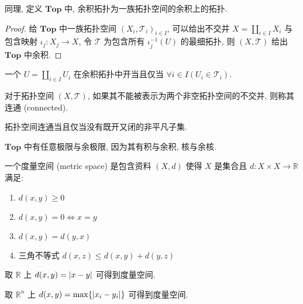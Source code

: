 \begin{definition}[余积拓扑]
    同理, 定义 \(\mathbf{Top}\) 中, 余积拓扑为一族拓扑空间的余积上的拓扑.

    \begin{proof}
        给 \(\mathbf{Top}\) 中一族拓扑空间 \({(X_i, \mathcal{T}_i)}_{i \in I}\), 可以给出不交并 \(X = \coprod_{i \in I} X_i\) 与包含映射
        \(\iota_j : X_j \to X\), 令 \(\mathcal{T}\) 为包含所有 \(\iota_j^{-1} (U)\) 的最细拓扑, 则 \((X,\mathcal{T})\) 给出 \(\mathbf{Top}\) 中余积.
    \end{proof}
\end{definition}

\begin{corollary}
    一个 \(U = \coprod_{i \in I} U_i\) 在余积拓扑中开当且仅当 \(\forall i \in I (U_i \in \mathcal{T}_i)\).
\end{corollary}

\begin{definition}[连通]
    对于拓扑空间 \((X,\mathcal{T})\), 如果其不能被表示为两个非空拓扑空间的不交并, 则称其连通 (connected).
\end{definition}

\begin{lemma}
    拓扑空间连通当且仅当没有既开又闭的非平凡子集.
\end{lemma}

\begin{lemma}
    \(\mathbf{Top}\) 中有任意极限与余极限, 因为其有积与余积, 核与余核.
\end{lemma}

\begin{definition}
    一个度量空间 (metric space) 是包含资料 \((X,d)\) 使得 \(X\) 是集合且 \(d : X \times X \to \mathbb{R}\) 满足:
    \begin{enumerate}
        \item \(d(x,y) \ge 0\)
        \item \(d(x,y) = 0 \iff x = y\)
        \item \(d(x,y) = d(y,x)\)
        \item 三角不等式 \(d(x,z) \le d(x,y) + d(y,z)\)
    \end{enumerate}
\end{definition}

\begin{example}
    取 \(\mathbb{R}\) 上 \(d(x,y) = \abs{x - y}\) 可得到度量空间.
\end{example}

\begin{example}
    取 \(\mathbb{R}^n\) 上 \(d(x,y) = \max \{\abs{x_i - y_i}\}\) 可得到度量空间.
\end{example}

